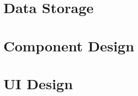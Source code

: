 \documentclass[11pt,letterpaper]{article}
\begin{document}
\section{Data Storage}


\section{Component Design}

\section{UI Design}



\clearpage
\nocite{*}
\printbibliography[title={References}]
\end{document}
